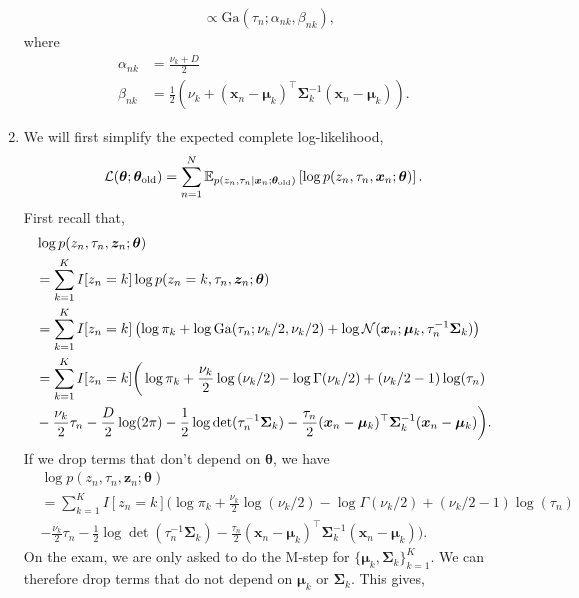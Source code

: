 \begin{enumerate}[label = (\alph*)]
\begin{align*}
        &\propto \mathrm{Ga}(\tau_n; \alpha_{nk},\beta_{nk}),
    \end{align*}
    where
    \begin{align*}
        \alpha_{nk}&=\frac{\nu_k+D}{2}\\
        \beta_{nk}&=\frac{1}{2}\left(\nu_k + (\bm{x}_n-\bm{\mu}_k)^\top\bm{\Sigma}_k^{-1}(\bm{x}_n - \bm{\mu}_k)\right).
    \end{align*}
    \item We will first simplify the expected complete log-likelihood,
    \[\mathcal{L}(\bm{\theta};\bm{\theta}_{\mathrm{old}}) = \sum_{n=1}^N {\mathbb E}_{p(z_n, \tau_n \mid \bm{x}_n;\bm{\theta}_{\mathrm{old}})}\left[\log p(z_n,\tau_n,\bm{x}_n;\bm{\theta})\right]. \]
    First recall that,
    \begin{align*}
        &\log p(z_n,\tau_n,\bm{z}_n;\bm{\theta})\\
        &=\sum_{k=1}^K I[z_n = k]\log p(z_n = k,\tau_n,\bm{z}_n;\bm{\theta})\\
        &=\sum_{k=1}^K I[z_n = k]\left(\log \pi_k + \log \mathrm{Ga}(\tau_n;\nu_k/2,\nu_k/2) + \log {\mathcal N}(\bm{x}_n; \bm{\mu}_k, \tau_n^{-1}\bm{\Sigma}_k)\right)\\
        &=\sum_{k=1}^K I[z_n = k]\bigg(\log \pi_k + \frac{\nu_k}{2}\log\left(\nu_k/2\right) - \log \Gamma(\nu_k/2) + (\nu_k/2-1)\log(\tau_n)\\
        & - \frac{\nu_k}{2}\tau_n- \frac{D}{2}\log(2\pi) -\frac{1}{2}\log \det(\tau_n^{-1}\bm{\Sigma}_k) - \frac{\tau_n}{2}(\bm{x}_n - \bm{\mu}_k)^\top \bm{\Sigma}_k^{-1}(\bm{x}_n - \bm{\mu}_k) \bigg).
    \end{align*}
    If we drop terms that don't depend on $\bm{\theta}$, we have
    \begin{align}
        &\log p(z_n,\tau_n,\bm{z}_n;\bm{\theta})\nonumber \\
        &=\sum_{k=1}^K I[z_n = k]\bigg(\log \pi_k + \frac{\nu_k}{2}\log\left(\nu_k/2\right) - \log \Gamma(\nu_k/2) + (\nu_k/2-1)\log(\tau_n)\nonumber \\
        & - \frac{\nu_k}{2}\tau_n -\frac{1}{2}\log \det(\tau_n^{-1}\bm{\Sigma}_k) - \frac{\tau_n}{2}(\bm{x}_n - \bm{\mu}_k)^\top \bm{\Sigma}_k^{-1}(\bm{x}_n - \bm{\mu}_k) \bigg).\label{eq:2022 Q5 log like}
    \end{align}
    On the exam, we are only asked to do the M-step for $\{\bm{\mu}_k,\bm{\Sigma}_k\}_{k=1}^K$. We can therefore drop terms that do not depend on $\bm{\mu}_k$ or $\bm{\Sigma}_k$. This gives,
    \begin{align*}

\end{align*}
\end{enumerate}
